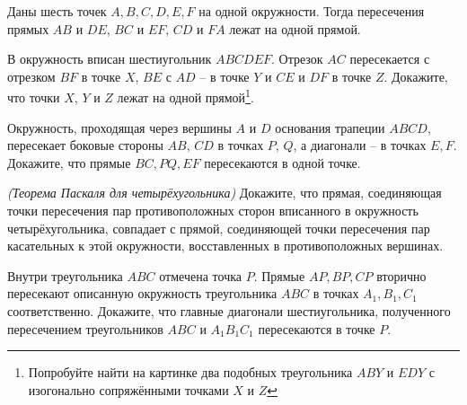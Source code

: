 \resetproblem \begingroup %
    \def\jeolmdate{09 июня 2018 г., пара 2}%
    \def\jeolmgroupname{9-3}%
    \def\jeolmauthors{Соколов~А.\,А.}%
\jeolmheader \endgroup


 Даны шесть точек $A, B, C, D, E, F$ на одной окружности. Тогда пересечения прямых $AB$ и $DE$, $BC$ и $EF$, $CD$ и $FA$ лежат на одной прямой.


\begin{problems}

\item В окружность вписан шестиугольник $ABCDEF$. Отрезок $AC$ пересекается с отрезком $BF$ в точке $X$, $BE$ с $AD$ -- в точке $Y$ и $CE$ и $DF$ в точке $Z$. Докажите, что точки $X$, $Y$ и $Z$ лежат на одной прямой\footnote{Попробуйте найти на картинке два подобных треугольника $ABY$ и $EDY$ с изогонально сопряжёнными точками $X$ и $Z$}.

\item Окружность, проходящая через вершины $A$ и $D$ основания трапеции $ABCD$, пересекает боковые стороны $AB$, $CD$ в точках $P$, $Q$, а диагонали -- в точках $E, F$. Докажите, что прямые $BC, PQ, EF$ пересекаются в одной точке.


\item \emph{(Теорема Паскаля для четырёхугольника)} Докажите, что прямая, соединяющая точки пересечения пар противоположных сторон вписанного в окружность четырёхугольника, совпадает с прямой, соединяющей точки пересечения пар касательных к этой окружности, восставленных в противоположных вершинах.


\item Внутри треугольника $ABC$ отмечена точка $P$. Прямые $AP, BP, CP$ вторично пересекают описанную окружность треугольника $ABC$ в точках $A_1, B_1, C_1$ соответственно. Докажите, что главные диагонали шестиугольника, полученного пересечением треугольников $ABC$ и $A_1B_1C_1$ пересекаются в точке $P$.



\end{problems}
